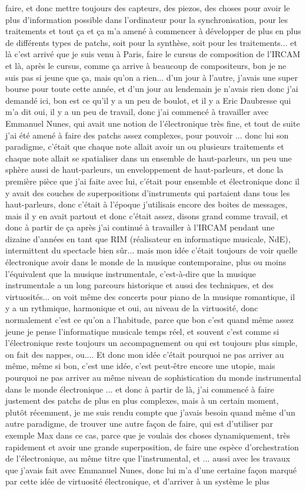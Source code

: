 faire, et donc mettre toujours des capteurs, des piezos, des choses pour avoir le plus d'information possible dans l'ordinateur pour la synchronisation, pour les traitements et tout ça et ça m'a amené à commencer à développer de plus en plus de différents types de patchs, soit pour la synthèse, soit pour les traitements... et là c'est arrivé que je suis venu à Paris, faire le cursus de composition de l'IRCAM et là, après le cursus, comme ça arrive à beaucoup de compositeurs, bon je ne suis pas si jeune que ça, mais qu'on a rien... d'un jour à l'autre, j'avais une super bourse pour toute cette année, et d'un jour au lendemain je n'avais rien donc j'ai demandé ici, bon est ce qu'il y a un peu de boulot, et il y a Eric Daubresse qui m'a dit oui, il y a un peu de travail, donc j'ai commencé à travailler avec Emmanuel Nunes, qui avait une notion de l'électronique très fine, et tout de suite j'ai été amené à faire des patchs assez complexes, pour pouvoir ... donc lui son paradigme, c'était que chaque note allait avoir un ou plusieurs traitements et chaque note allait se spatialiser dans un ensemble de haut-parleurs, un peu une sphère aussi de haut-parleurs, un enveloppement de haut-parleurs, et donc la première pièce que j'ai faite avec lui, c'était pour ensemble et électronique donc il y avait des couches de superpositions d'instruments qui partaient dans tous les haut-parleurs, donc c'était à l'époque j'utilisais encore des boites de messages, mais il y en avait partout et donc c'était assez, disons grand comme travail, et donc à partir de ça après j'ai continué à travailler à l'IRCAM pendant une dizaine d'années en tant que RIM (réalisateur en informatique musicale, NdE), intermittent du spectacle bien sûr... mais mon idée c'était toujours de voir quelle électronique avoir dans le monde de la musique contemporaine, plus ou moins l'équivalent que la musique instrumentale, c'est-à-dire que la musique instrumentale a un long parcours historique et aussi des techniques, et des virtuosités... on voit même des concerts pour piano de la musique romantique, il y a un rythmique, harmonique et oui, au niveau de la virtuosité, donc normalement c'est ce qu'on a l'habitude, parce que bon c'est quand même assez jeune je pense l'informatique musicale temps réel, et souvent c'est comme si l'électronique reste toujours un accompagnement ou qui est toujours plus simple, on fait des nappes, ou.... Et donc mon idée c'était pourquoi ne pas arriver au même, même si bon, c'est une idée, c'est peut-être encore une utopie, mais pourquoi ne pas arriver au même niveau de sophistication du monde instrumental dans le monde électronique ... et donc à partir de là, j'ai commencé à faire justement des patchs de plus en plus complexes, mais à un certain moment, plutôt récemment, je me suis rendu compte que j'avais besoin quand même d'un autre paradigme, de trouver une autre façon de faire, qui est d'utiliser par exemple Max dans ce cas, parce que je voulais des choses dynamiquement, très rapidement et avoir une grande superposition, de faire une espèce d'orchestration de l'électronique, au même titre que l'instrumental, et ... aussi avec les travaux que j'avais fait avec Emmanuel Nunes, donc lui m'a d'une certaine façon marqué par cette idée de virtuosité électronique, et d'arriver à un système le plus 